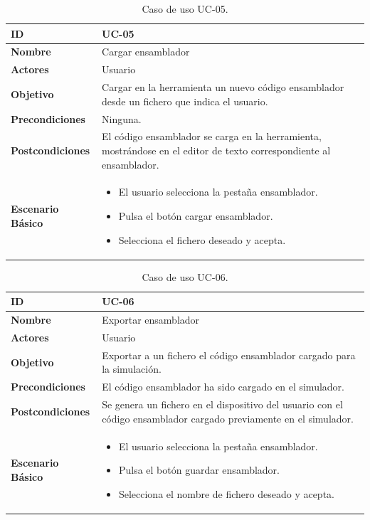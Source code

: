 \begin{center}
\begin{table}[htbp]
\centering
\caption{Caso de uso UC-05.}
\begin{tabular}{@{}p{2.5cm} p{9cm}@{}} 
\toprule
\textbf{ID}	& UC-05  \\
\midrule
\textbf{Nombre} 		& Cargar ensamblador   \\
\midrule
\textbf{Actores} 		&	Usuario  \\
\midrule
\textbf{Objetivo} 	&	Cargar en la herramienta un nuevo código ensamblador desde un fichero que indica el usuario. 	 \\
\midrule
\textbf{Precondiciones}	&	Ninguna.   \\
\midrule
\textbf{Postcondiciones} 	& El código ensamblador se carga en la herramienta, mostrándose en el editor de texto correspondiente al ensamblador.   \\
\midrule
\textbf{Escenario Básico} 	&  \begin{itemize}
\item El usuario selecciona la pestaña ensamblador.
\item Pulsa el botón cargar ensamblador.
\item Selecciona el fichero deseado y acepta.
\end{itemize} \\
\bottomrule
\end{tabular}
\label{tab:uc05}
\end{table}
\end{center}

\begin{center}
\begin{table}[htbp]
\centering
\caption{Caso de uso UC-06.}
\begin{tabular}{@{}p{2.5cm} p{9cm}@{}} 
\toprule
\textbf{ID}	& UC-06  \\
\midrule
\textbf{Nombre} 		& Exportar ensamblador   \\
\midrule
\textbf{Actores} 		&	Usuario  \\
\midrule
\textbf{Objetivo} 	&	Exportar a un fichero el código ensamblador cargado para la simulación. 	 \\
\midrule
\textbf{Precondiciones}	&	El código ensamblador ha sido cargado en el simulador.   \\
\midrule
\textbf{Postcondiciones} 	& Se genera un fichero en el dispositivo del usuario con el código ensamblador cargado previamente en el simulador.   \\
\midrule
\textbf{Escenario Básico} 	&  \begin{itemize}
\item El usuario selecciona la pestaña ensamblador.
\item Pulsa el botón guardar ensamblador.
\item Selecciona el nombre de fichero deseado y acepta.
\end{itemize} \\
\bottomrule
\end{tabular}
\label{tab:uc06}
\end{table}
\end{center}

